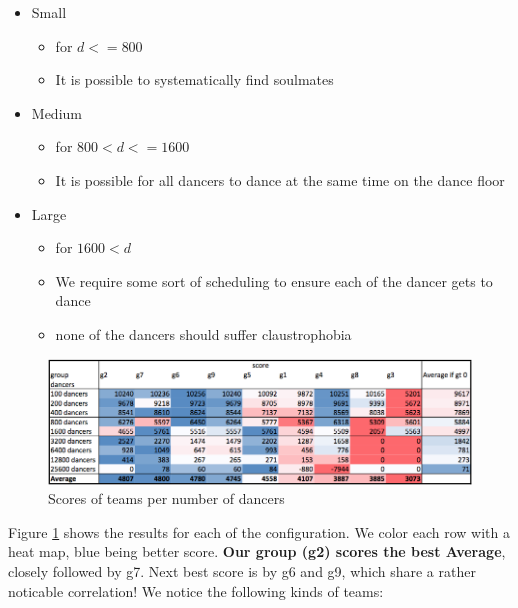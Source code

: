 \begin{itemize}
\tightlist
\item
  Small

  \begin{itemize}
  \tightlist
  \item
    for \(d<=800\)
  \item
    It is possible to systematically find soulmates
  \end{itemize}
\item
  Medium

  \begin{itemize}
  \tightlist
  \item
    for \(800 < d <=1600\)
  \item
    It is possible for all dancers to dance at the same time on the
    dance floor
  \end{itemize}
\item
  Large

  \begin{itemize}
  \tightlist
  \item
    for \(1600 < d\)
  \item
    We require some sort of scheduling to ensure each of the dancer gets
    to dance
  \item
    none of the dancers should suffer claustrophobia
  \end{itemize}
\end{itemize}

\begin{figure}[htbp]
\centering
\includegraphics[width=\textwidth]{imgs/team-scores.png}
\caption{Scores of teams per number of dancers\label{team-scores}}
\end{figure}

Figure \ref{team-scores} shows the results for each of the
configuration. We color each row with a heat map, blue being better
score. \textbf{Our group (g2) scores the best Average}, closely followed
by g7. Next best score is by g6 and g9, which share a rather noticable
correlation! We notice the following kinds of teams:

